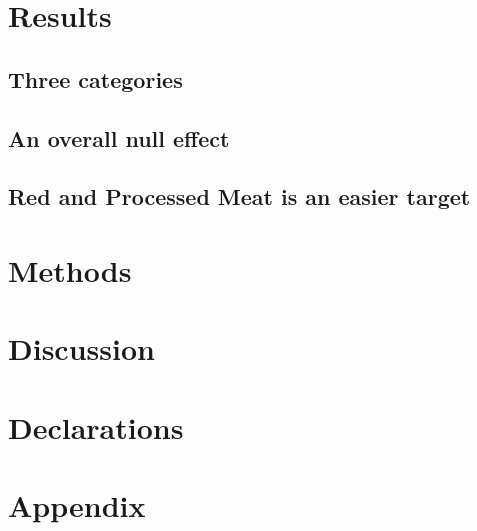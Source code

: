 \documentclass[sn-nature,pdflatex]{sn-jnl}
\begin{document}
\section{Results}\label{sec2}

\subsection{Three categories}\label{three-categories}

\subsection{An overall null effect}\label{an-overall-null-effect}

\subsection{Red and Processed Meat is an easier
target}\label{red-and-processed-meat-is-an-easier-target}

\section{Methods}\label{sec3}

\section{Discussion}\label{sec4}

\backmatter



\section*{Declarations}\label{declarations}

\section{Appendix}\label{secA1}

\renewcommand\refname{Bibliography}

\end{document}
